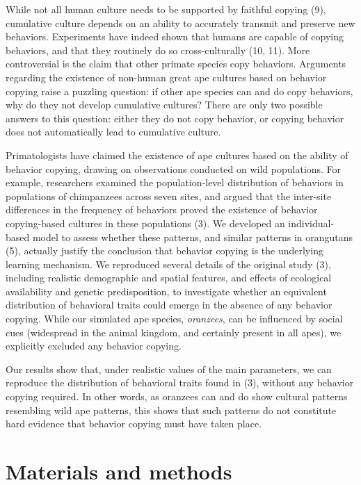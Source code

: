 \documentclass[9pt,twocolumn,twoside,]{pnas-new}
\begin{document}
While not all human culture needs to be supported by faithful copying
(9), cumulative culture depends on an ability to accurately transmit and
preserve new behaviors. Experiments have indeed shown that humans are
capable of copying behaviors, and that they routinely do so
cross-culturally (10, 11). More controversial is the claim that other
primate species copy behaviors. Arguments regarding the existence of
non-human great ape cultures based on behavior copying raise a puzzling
question: if other ape species can and do copy behaviors, why do they
not develop cumulative cultures? There are only two possible answers to
this question: either they do not copy behavior, or copying behavior
does not automatically lead to cumulative culture.

Primatologists have claimed the existence of ape cultures based on the
ability of behavior copying, drawing on observations conducted on wild
populations. For example, researchers examined the population-level
distribution of behaviors in populations of chimpanzees across seven
sites, and argued that the inter-site differences in the frequency of
behaviors proved the existence of behavior copying-based cultures in
these populations (3). We developed an individual-based model to assess
whether these patterns, and similar patterns in orangutans (5), actually
justify the conclusion that behavior copying is the underlying learning
mechanism. We reproduced several details of the original study (3),
including realistic demographic and spatial features, and effects of
ecological availability and genetic predisposition, to investigate
whether an equivalent distribution of behavioral traits could emerge in
the absence of any behavior copying. While our simulated ape species,
\emph{oranzees}, can be influenced by social cues (widespread in the
animal kingdom, and certainly present in all apes), we explicitly
excluded any behavior copying.

Our results show that, under realistic values of the main parameters, we
can reproduce the distribution of behavioral traits found in (3),
without any behavior copying required. In other words, as oranzees can
and do show cultural patterns resembling wild ape patterns, this shows
that such patterns do not constitute hard evidence that behavior copying
must have taken place.

\section*{Materials and methods}\label{materials-and-methods}
\end{document}
